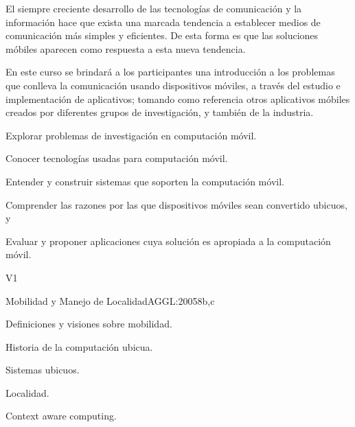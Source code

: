 \begin{syllabus}


\begin{justification}
El siempre creciente desarrollo de las tecnologías de comunicación y la
información hace que exista una marcada tendencia a  establecer medios de 
comunicación más simples y eficientes. De esta forma es que las soluciones
móbiles aparecen como respuesta a esta nueva tendencia.

En este curso se brindará a los participantes una introducción a los
problemas que conlleva la comunicación usando dispositivos móviles, a través del
estudio e implementación de aplicativos; tomando como referencia otros aplicativos
móbiles creados por diferentes grupos de investigación, y también de la industria.

\end{justification}

\begin{goals}
      \item Explorar problemas de investigación en computación móvil.
      \item Conocer tecnologías usadas para computación móvil.
      \item Entender y construir sistemas que soporten la computación móvil.
      \item Comprender las razones por las que dispositivos móviles sean convertido ubicuos, y
      \item Evaluar y proponer aplicaciones cuya solución es apropiada a la computación móvil.

\end{goals}

\begin{outcomes}{V1}
\end{outcomes}

\begin{unit}{Mobilidad y Manejo de Localidad}{}{AGGL:2005}{8}{b,c}
   \begin{topics}
     \item Definiciones y visiones sobre mobilidad.
     \item Historia de la computación ubicua.
     \item Sistemas ubicuos.
     \item Localidad.
     \item Context aware computing.
   \end{topics}


\end{unit}
\end{syllabus}
